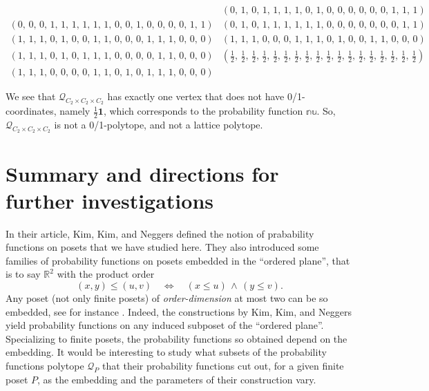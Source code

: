 \documentclass[11pt,a4paper,abstract=yes]{scrartcl}
\theoremstyle{plain}
\newcommand{\RR}{\mathbb{R}}
\newcommand{\probnull}{\mathbb{nu}}
\newcommand{\prpolytope}[1]{\mathcal{Q}_{#1}}
\begin{document}
\begin{mexample}
\begin{tiny}
\begin{displaymath}
\begin{array}{cc}
 &
\left(0,\,1,\,0,\,1,\,1,\,1,\,1,\,0,\,1,\,0,\,0,\,0,\,0,\,0,\,0,\,1,\,1,\,1\right)
 \\
\left(0,\,0,\,0,\,1,\,1,\,1,\,1,\,1,\,1,\,0,\,0,\,1,\,0,\,0,\,0,\,0,\,1,\,1\right)
 &
\left(0,\,1,\,0,\,1,\,1,\,1,\,1,\,1,\,1,\,0,\,0,\,0,\,0,\,0,\,0,\,0,\,1,\,1\right)
 \\
\left(1,\,1,\,1,\,0,\,1,\,0,\,0,\,1,\,1,\,0,\,0,\,0,\,1,\,1,\,1,\,0,\,0,\,0\right)
 &
\left(1,\,1,\,1,\,0,\,0,\,0,\,1,\,1,\,1,\,0,\,1,\,0,\,0,\,1,\,1,\,0,\,0,\,0\right)
 \\
\left(1,\,1,\,1,\,0,\,1,\,0,\,1,\,1,\,1,\,0,\,0,\,0,\,0,\,1,\,1,\,0,\,0,\,0\right)
 &
\left(\frac{1}{2},\,\frac{1}{2},\,\frac{1}{2},\,\frac{1}{2},\,\frac{1}{2},\,\frac{1}{2},\,\frac{1}{2},\,\frac{1}{2},\,\frac{1}{2},\,\frac{1}{2},\,\frac{1}{2},\,\frac{1}{2},\,\frac{1}{2},\,\frac{1}{2},\,\frac{1}{2},\,\frac{1}{2},\,\frac{1}{2},\,\frac{1}{2}\right)
 \\
\left(1,\,1,\,1,\,0,\,0,\,0,\,0,\,1,\,1,\,0,\,1,\,0,\,1,\,1,\,1,\,0,\,0,\,0\right)
 &
\end{array}\end{displaymath}\end{tiny}

We see that \(\prpolytope{C_{2} \times C_{2} \times C_{2}}\)
has exactly one vertex that does not have 0/1-coordinates, namely \(\frac{1}{2} \mathbf{1}\),
which corresponds to the probability function \(\probnull{}\).
So, \(\prpolytope{C_{2} \times C_{2} \times C_{2}}\) is not a 0/1-polytope, and not a lattice polytope.
\label{C2C2C2-vertices}
\end{mexample}
\section{Summary and directions for further investigations}
\label{sec:org2b04fb3}
In their article, Kim, Kim, and Neggers \autocite{neggers2019probfunc} defined
the notion of prabability functions on posets that we have studied here.
They also introduced some families of probability functions on posets
embedded in the ``ordered plane'', that is to say \(\RR^{2}\) with the product order
\[(x,y) \le (u,v) \quad \iff \quad (x \le u) \, \wedge \, (y \le v).\]
Any poset (not only finite posets) of \emph{order-dimension} at most two can be so embedded, see for instance
\autocite{Trotter:Poset}. Indeed, the constructions by Kim, Kim, and Neggers yield
probability functions on  any induced subposet of the ``ordered plane''. Specializing to finite posets,
the probability functions so obtained depend on the embedding. It would be interesting to
study what subsets of the probability functions polytope \(\prpolytope{P}\) that their probability functions cut out,
for a given finite poset \(P\), as the embedding and the parameters of their construction vary.
\end{document}
